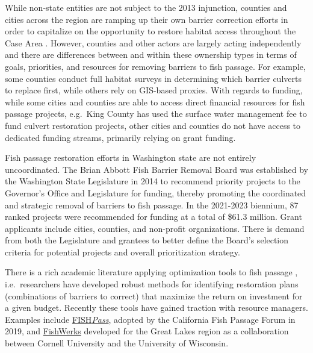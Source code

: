 While non-state entities are not subject to the 2013 injunction, counties and cities across the region are ramping up their own barrier correction efforts in order to capitalize on the opportunity to restore habitat access throughout the Case Area \citep{brown_coming_2019}. However, counties and other actors are largely acting independently and there are differences between and within these ownership types in terms of goals, priorities, and resources for removing barriers to fish passage. For example, some counties conduct full habitat surveys in determining which barrier culverts to replace first, while others rely on GIS-based proxies. With regards to funding, while some cities and counties are able to access direct financial resources for fish passage projects, e.g.\ King County has used the surface water management fee to fund culvert restoration projects, other cities and counties do not have access to dedicated funding streams, primarily relying on grant funding.  

Fish passage restoration efforts in Washington state are not entirely uncoordinated. The Brian Abbott Fish Barrier Removal Board was established by the Washington State Legislature in 2014 to recommend priority projects to the Governor's Office and Legislature for funding, thereby promoting the coordinated and strategic removal of barriers to fish passage. In the 2021-2023 biennium, 87 ranked projects were recommended for funding at a total of \$61.3 million. Grant applicants include cities, counties, and non-profit organizations. There is demand from both the Legislature and grantees to better define the Board's selection criteria for potential projects and overall prioritization strategy. 


There is a rich academic literature applying optimization tools to fish passage \citep{ohanley_optimizing_2005, kuby_multiobjective_2005, couto_safeguarding_2021}, i.e.\ researchers have developed robust methods for identifying restoration plans (combinations of barriers to correct) that maximize the return on investment for a given budget. Recently these tools have gained traction with resource managers. Examples include  \href{https://fishpass.psmfc.org}{FISH\emph{Pass}}, adopted by the California Fish Passage Forum in 2019, and \href{https://greatlakesconnectivity.org}{FishWerks} developed for the Great Lakes region as a collaboration between Cornell University and the University of Wisconsin. 


